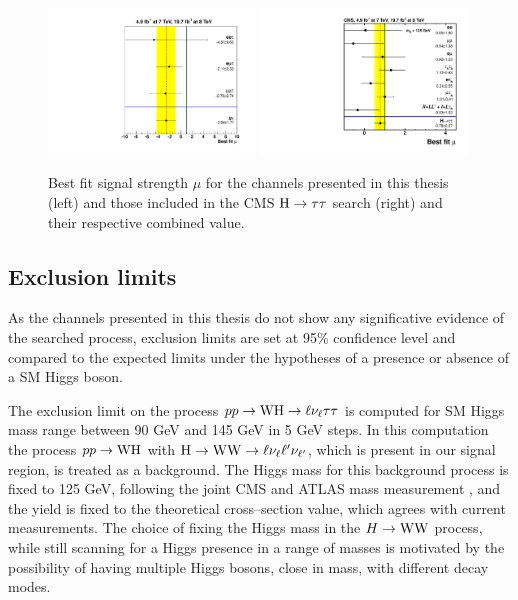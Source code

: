 \begin{figure}
        \centering
	\includegraphics[width=0.49\textwidth]{4_Analisys/pics/limits/mu_values.pdf}
	\includegraphics[width=0.49\textwidth]{1_Introduction_Th_and_Exp/pics/BestFit_sm_per_chn.pdf}
       \caption{Best fit signal strength $\mu$ for the channels presented in this thesis (left) and those included in the CMS $\mathrm{H} \rightarrow \tau \tau$ search (right) and their respective combined value.}
       \label{fig:mu_vals}
\end{figure}



\subsection{Exclusion limits}

{\color{red}
As the channels presented in this thesis do not show any significative evidence of the searched process, exclusion limits are set at 95\% confidence level and compared to the expected limits under the hypotheses of a presence or absence of a SM Higgs boson.
}

The exclusion limit on the process $pp\rightarrow\mathrm{W}\mathrm{H}\rightarrow\ell\nu_\ell\tau\tau$ is computed for SM Higgs mass range between 90 GeV and 145 GeV in 5 GeV steps. In this computation the process $pp\rightarrow\mathrm{W}\mathrm{H}$ with $\mathrm{H}\rightarrow\mathrm{W}\mathrm{W}\rightarrow\ell\nu_{\ell}\ell'\nu_{\ell'}$, which is present in our signal region, is treated as a background. The Higgs mass for this background process is fixed to 125 GeV, following the joint CMS and ATLAS mass measurement \cite{CMS:2014ega, Aad:2014aba}, and the yield is fixed to the theoretical cross--section value, which agrees with current measurements. The choice of fixing the Higgs mass in the $H\rightarrow\mathrm{W}\mathrm{W}$ process, while still scanning for a Higgs presence in a range of masses is motivated by the possibility of having multiple Higgs bosons, close in mass, with different decay modes.

